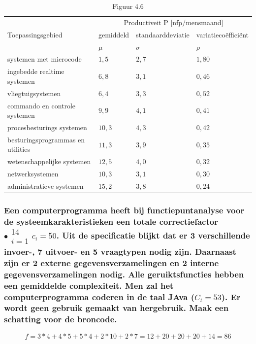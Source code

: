 \documentclass[a4paper,titlepage]{artikel1}
\begin{document}
   \begin{table}[h] %
     \caption{Figuur 4.6}\label{reffig46}
     \begin{tabular}[t]{|l|l|l|l|}
       \hline
       \multirow{3}{*}{Toepassingsgebied} & \multicolumn{3}{c|}{Productiveit P [nfp/mensmaand]} \\
       \cline{2-4}
       & gemiddeld & standaarddeviatie & variatieco\"{e}ffici\"{e}nt \\
       & $\mu$ & $\sigma$ & $\rho$ \\
       \hline
       systemen met microcode & $1,5$ & $2,7$ & $1,80$ \\
       ingebedde realtime systemen & $6,8$ & $3,1$ & $0,46$ \\
       vliegtuigsystemen & $6,4$ & $3,3$ & $0,52$ \\
       commando en controle systemen & $9,9$ & $4,1$ & $0,41$ \\
       procesbesturings systemen & $10,3$ & $4,3$ & $0,42$ \\
       besturingsprogrammas en utilities & $11,3$ & $3,9$ & $0,35$ \\
       wetenschappelijke systemen & $12,5$ & $4,0$ & $0,32$ \\
       netwerksystemen & $10,3$ & $3,1$ & $0,30$ \\
       administratieve systemen & $15,2$ & $3,8$ & $0,24$ \\
       \hline
     \end{tabular}
   \end{table}
   
   \subsubsection[Opdracht 6]{Een computerprogramma heeft bij functiepuntanalyse voor de systeemkarakteristieken een totale correctiefactor $\bullet \begin{array}{c}14\\i=1 \end{array} c_i=50$. Uit de specificatie blijkt dat er 3 verschillende invoer-, 7 uitvoer- en 5 vraagtypen nodig zijn. Daarnaast zijn er 2 externe gegevensverzamelingen en 2 interne gegevensverzamelingen nodig. Alle geruiktsfuncties hebben een gemiddelde complexiteit. Men zal het computerprogramma coderen in de taal JAva ($C_t=53$). Er wordt geen gebruik gemaakt van hergebruik. Maak een schatting voor de broncode.}
   \begin{displaymath}
    f=3*4+4*5+5*4+2*10+2*7=12+20+20+20+14=86
   \end{displaymath}
   
\end{document}
